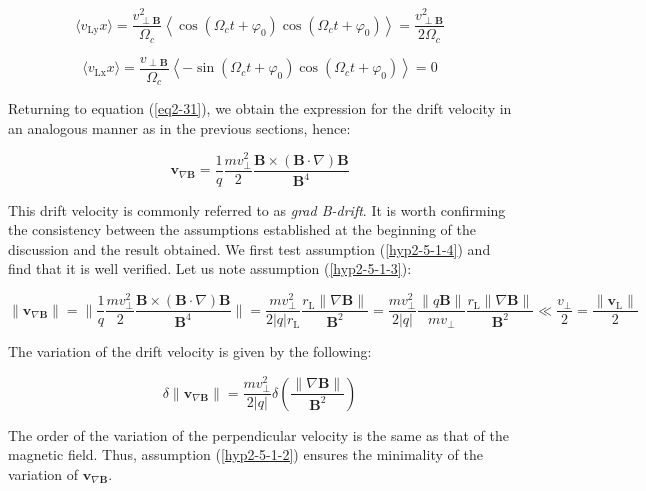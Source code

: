 \begin{equation}
    \langle v_\text{Ly}x\rangle=\frac{v_{\perp\mathbf{B}}^2}{\Omega_c}\left\langle\cos(\Omega_ct+\varphi_0)\cos(\Omega_ct+\varphi_0)\right\rangle=\frac{v_{\perp\mathbf{B}}^2}{2\Omega_c}
\end{equation}

\begin{equation}
    \langle v_\text{Lx}x\rangle=\frac{v_{\perp\mathbf{B}}}{\Omega_c}\left\langle-\sin(\Omega_ct+\varphi_0)\cos(\Omega_ct+\varphi_0)\right\rangle=0
\end{equation}

Returning to equation (\ref{eq2-31}), we obtain the expression for the drift velocity in an analogous manner as in the previous sections, hence:

\begin{equation}
    \label{eq2-36}
    \mathbf{v}_{\nabla\mathbf{B}}=\frac{1}{q}\frac{mv_{\perp}^2}{2}\frac{\mathbf{B}\times(\mathbf{B}\cdot\nabla)\mathbf{B}}{\mathbf{B}^4}
\end{equation}

This drift velocity is commonly referred to as \textit{grad B-drift}. It is worth confirming the consistency between the assumptions established at the beginning of the discussion and the result obtained. We first test assumption (\ref{hyp2-5-1-4}) and find that it is well verified. Let us note assumption (\ref{hyp2-5-1-3}):

\begin{equation}
    \|\mathbf{v}_{\nabla\mathbf{B}}\|=\Bigg\|\frac{1}{q}\frac{mv_\perp^2}{2}\frac{\mathbf{B}\times(\mathbf{B}\cdot\nabla)\mathbf{B}}{\mathbf{B}^4}\Bigg\|=\frac{mv_\perp^2}{2|q|r_\text{L}}\frac{r_\text{L}\|\nabla\mathbf{B}\|}{\mathbf{B}^2}=\frac{mv_\perp^2}{2|q|}\frac{\|q\mathbf{B}\|}{mv_\perp}\frac{r_\text{L}\|\nabla\mathbf{B}\|}{\mathbf{B}^2}\ll\frac{v_\perp}{2}=\frac{\|\mathbf{v}_\text{L}\|}{2}
\end{equation}

The variation of the drift velocity is given by the following:

\begin{equation}
    \delta\|\mathbf{v}_{\nabla\mathbf{B}}\|=\frac{mv_\perp^2}{2|q|}\delta\left(\frac{\|\nabla\mathbf{B}\|}{\mathbf{B}^2}\right)
\end{equation}

The order of the variation of the perpendicular velocity is the same as that of the magnetic field. Thus, assumption (\ref{hyp2-5-1-2}) ensures the minimality of the variation of $\mathbf{v}_{\nabla\mathbf{B}}$.

